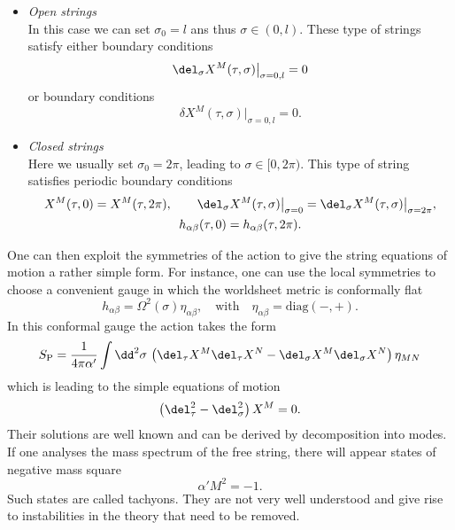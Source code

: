 \begin{itemize}
\item \textit{Open strings}\\[2mm]
In this case we can set $\sigma_{0}=l$ ans thus $\sigma\in (0,l)$. These type of strings satisfy either   boundary conditions
%
\begin{equation}
\del_{\sigma}X^{M}(\tau,\sigma)\big\vert_{\sigma=0,l} = 0
\end{equation}
%
or  boundary conditions
%
\begin{equation}
\delta X^{M}(\tau,\sigma)\big\vert_{\sigma=0,l}=0.
\end{equation}
%
%
\item \textit{Closed strings}\\[2mm]
Here we usually set $\sigma_{0}=2\pi$, leading to $\sigma\in [0,2\pi)$. This type of string satisfies periodic boundary conditions
%
\begin{gather}
X^{M}(\tau,0)=X^{M}(\tau,2\pi), \qquad \del_{\sigma}X^{M}(\tau	,\sigma)\big\vert_{\sigma=0} = \del_{\sigma}X^{M}(\tau	,\sigma)\big\vert_{\sigma=2\pi}, \notag\\ h_{\alpha\beta}(\tau,0)=h_{\alpha\beta}(\tau,2\pi).
\end{gather}
\end{itemize}
%
%
One can then exploit the symmetries of the  action to give the string equations of motion a rather simple form. For instance, one can use the local symmetries to choose a convenient gauge in which the worldsheet metric is conformally flat
%
%
\begin{equation}
h_{\alpha\beta} = \mathit{\Omega}^{2}(\sigma) \eta_{\alpha\beta}, \quad \text{with} \quad \eta_{\alpha\beta} = \text{diag}(-,+).
\end{equation}
%
%
In this conformal gauge the  action takes the form
%
%
\begin{equation}
S_{\rm P} = \frac{1}{4\pi\alpha'} \int \dd^{2}\sigma\, \left(\del_{\tau}X^{M}\del_{\tau}X^{N}-\del_{\sigma}X^{M}\del_{\sigma}X^{N}\right)\eta_{MN}
\end{equation}
%
%
which is leading to the simple equations of motion
%
%
\begin{equation}
\left(\del_{\tau}^{2}-\del_{\sigma}^{2}\right)X^{M}=0.
\end{equation}
%
%
Their solutions are well known and can be derived by decomposition into  modes. If one analyses the mass spectrum of the free string, there will appear states of negative mass square
%
%
\begin{equation}
\alpha' M^{2} = -1.
\end{equation}
%
%
Such states are called tachyons. They are not very well understood and give rise to instabilities in the theory that need to be removed.
%
%
%
%
%
%
%
%
%
%
